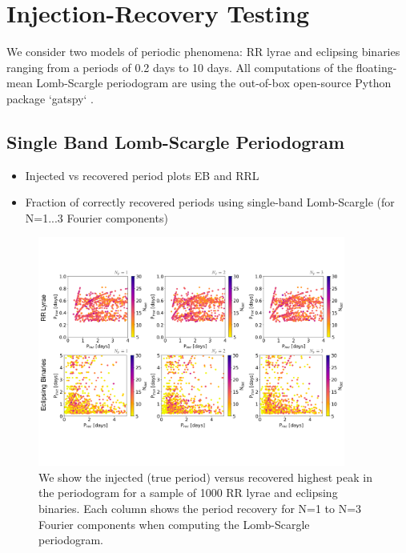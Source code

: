 \documentclass[DM,authoryear,toc]{lsstdoc}
\begin{document}
\section{Injection-Recovery Testing}

We consider two models of periodic phenomena: RR lyrae and eclipsing binaries ranging from a periods of 0.2 days to 10 days. All computations of the floating-mean Lomb-Scargle periodogram are using the out-of-box open-source Python package `gatspy` \citet{VanderPlas:VP2015}. 



\subsection{Single Band Lomb-Scargle Periodogram}

\begin{itemize}
\item Injected vs recovered period plots EB and RRL
\item Fraction of correctly recovered periods using single-band Lomb-Scargle (for N=1...3 Fourier components)  
\end{itemize}

\begin{figure}
  \includegraphics[width=0.9\textwidth]{figures/singleband_lsp.pdf}
  \centering 
  \caption{We show the injected (true period) versus recovered highest peak in the periodogram for a sample of 1000 RR lyrae and eclipsing binaries. Each column shows the period recovery for N=1 to N=3 Fourier components when computing the Lomb-Scargle periodogram.}
  \label{fig:comp}
\end{figure}
\end{document}
